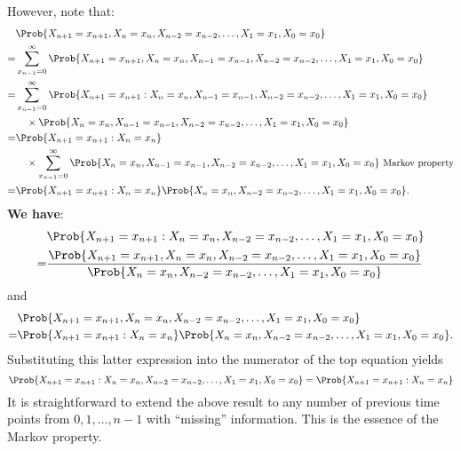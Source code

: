 \begin{Regular}
\begin{enumerate}[(1)]
              However, note that:
              \begin{align*}
                    & \Prob{X_{n+1}=x_{n+1}, X_{n}=x_{n}, X_{n-2}=x_{n-2}, \ldots, X_{1}=x_{1}, X_{0}=x_{0}}                                                                      \\
                  = & \sum_{x_{n-1}=0}^{\infty} \Prob{X_{n+1}=x_{n+1}, X_{n}=x_{n}, X_{n-1}=x_{n-1}, X_{n-2}=x_{n-2}, \ldots, X_{1}=x_{1}, X_{0}=x_{0}}                           \\
                  = & \sum_{x_{n-1}=0}^{\infty} \Prob{X_{n+1}=x_{n+1} \given X_{n}=x_{n}, X_{n-1}=x_{n-1}, X_{n-2}=x_{n-2}, \ldots, X_{1}=x_{1}, X_{0}=x_{0}}                     \\
                    & \quad\times \Prob{X_{n}=x_{n}, X_{n-1}=x_{n-1}, X_{n-2}=x_{n-2}, \ldots, X_{1}=x_{1}, X_{0}=x_{0}}                                                          \\
                  = & \Prob{X_{n+1}=x_{n+1} \given X_{n}=x_{n}}                                                                                                                   \\
                    & \quad\times \sum_{x_{n-1}=0}^{\infty} \Prob{X_{n}=x_{n}, X_{n-1}=x_{n-1}, X_{n-2}=x_{n-2}, \ldots, X_{1}=x_{1}, X_{0}=x_{0}} \text{ \small Markov property} \\
                  = & \Prob{X_{n+1}=x_{n+1} \given X_{n}=x_{n}} \Prob{X_{n}=x_{n}, X_{n-2}=x_{n-2}, \ldots, X_{1}=x_{1}, X_{0}=x_{0}}.
              \end{align*}
              \textbf{We have}:
              \begin{align*}
                    & \Prob{X_{n+1}=x_{n+1} \given X_{n}=x_{n}, X_{n-2}=x_{n-2}, \ldots, X_{1}=x_{1}, X_{0}=x_{0}}                                                                         \\
                  = & \frac{\Prob{X_{n+1}=x_{n+1}, X_{n}=x_{n}, X_{n-2}=x_{n-2}, \ldots, X_{1}=x_{1}, X_{0}=x_{0}}}{\Prob{X_{n}=x_{n}, X_{n-2}=x_{n-2}, \ldots, X_{1}=x_{1}, X_{0}=x_{0}}}
              \end{align*}
              and
              \begin{align*}
                    & \Prob{X_{n+1}=x_{n+1}, X_{n}=x_{n}, X_{n-2}=x_{n-2}, \ldots, X_{1}=x_{1}, X_{0}=x_{0}}                           \\
                  = & \Prob{X_{n+1}=x_{n+1} \given X_{n}=x_{n}} \Prob{X_{n}=x_{n}, X_{n-2}=x_{n-2}, \ldots, X_{1}=x_{1}, X_{0}=x_{0}}.
              \end{align*}
              Substituting this latter expression into the numerator of the top equation yields
              \[ \Prob{X_{n+1}=x_{n+1} \given X_{n}=x_{n}, X_{n-2}=x_{n-2}, \ldots, X_{1}=x_{1}, X_{0}=x_{0}}=\Prob{X_{n+1}=x_{n+1} \given X_{n}=x_{n}} \]
              It is straightforward to extend the above result to any number of previous time points from
              $ 0,1,\ldots,n-1 $ with ``missing'' information. This is the essence of the Markov property.
    \end{enumerate}
\end{Regular}
